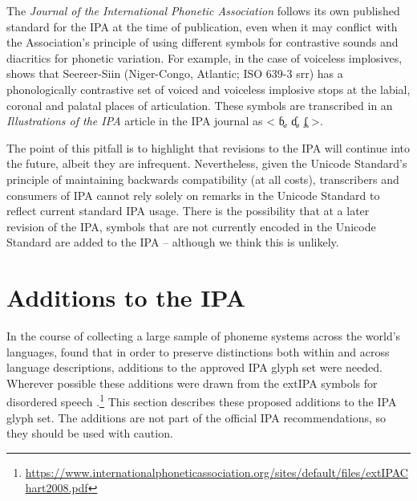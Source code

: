 The \textit{Journal of the International Phonetic Association} follows its own 
published standard for the IPA at the time of publication, even when it 
may conflict with the Association's principle of using different symbols 
for contrastive sounds and diacritics for phonetic variation. For example, 
in the case of voiceless implosives, \citet{McLaughlin2005} shows that 
Seereer-Siin (Niger-Congo, Atlantic; ISO 639-3 srr) has a phonologically 
contrastive set of voiced and voiceless implosive stops at the labial, 
coronal and palatal places of articulation. These symbols are transcribed 
in an \textit{Illustrations of the IPA} article in the IPA journal as 
< ɓ̥, ɗ̥, ʄ̥ >.

The point of this pitfall is to highlight that revisions to the IPA will 
continue into the future, albeit they are infrequent. Nevertheless, 
given the Unicode Standard's principle of maintaining backwards compatibility 
(at all costs), transcribers and consumers of IPA cannot rely solely on 
remarks in the Unicode Standard to reflect current standard IPA usage. 
There is the possibility that at a later revision of the IPA, symbols that 
are not currently encoded in the Unicode Standard are added to the IPA -- 
although we think this is unlikely. 

\section{Additions to the IPA}
\label{ipa-additions}

In the course of collecting a large sample of phoneme systems across the world's
languages, \citet{Moran_etal2014} found that in order 
to preserve distinctions both within and across language descriptions, 
additions to the approved IPA glyph set were needed. Wherever possible 
these additions were drawn from the extIPA symbols for disordered
speech \citep{Duckworth_etal1990}.\footnote{\url{https://www.internationalphoneticassociation.org/sites/default/files/extIPAChart2008.pdf}}
This section describes these proposed additions to the IPA glyph set. The
additions are not part of the official IPA recommendations, so they should be 
used with caution.

